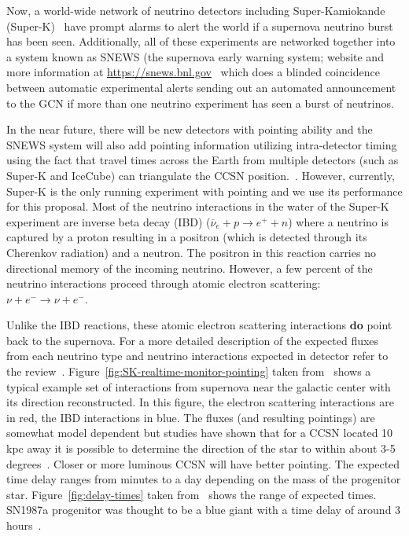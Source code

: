\documentclass[12pt, letterpaper]{article}
\newcommand{\superk}  {Super\nobreakdash-K\xspace}
\begin{document}
Now, a world-wide network of neutrino detectors including
Super-Kamiokande (\superk)~\cite{2003NIMPA.501..418F} have prompt
alarms to alert the world if a supernova neutrino burst has been seen.
Additionally, all of these experiments are networked together into a
system known as SNEWS (the supernova early warning system; website and
more information at
\url{https://snews.bnl.gov}~\cite{2004NJPh....6..114A} which does a
blinded coincidence between automatic experimental alerts sending out
an automated announcement to the GCN if more than one neutrino
experiment has seen a burst of neutrinos.

In the near future, there will be new detectors with pointing ability
and the SNEWS system will also add pointing information utilizing
intra-detector timing using the fact that travel times across the
Earth from multiple detectors (such as \superk and IceCube) can
triangulate the CCSN position.~\cite{Katepaper}.  However, currently,
\superk is the only running experiment with pointing and we use its
performance for this proposal. Most of the neutrino interactions in
the water of the \superk experiment are inverse beta decay (IBD)
($ \overline{\nu}_{e}+ p \rightarrow e^{+} + n $) where a neutrino is
captured by a proton resulting in a positron (which is detected
through its Cherenkov radiation) and a neutron.  The positron in this
reaction carries no directional memory of the incoming
neutrino. However, a few percent of the neutrino interactions proceed
through atomic electron scattering:
$\nu + e^{-} \rightarrow \nu + e^{-} .$

Unlike the IBD reactions, these atomic electron scattering
interactions {\bf do} point back to the supernova.  For a more
detailed description of the expected fluxes from each neutrino type
and neutrino interactions expected in detector refer to the
review~\cite{2012ARNPS..62...81S}.
Figure~\ref{fig:SK-realtime-monitor-pointing} taken
from~\cite{2016APh....81...39A} shows a typical example set of
interactions from supernova near the galactic center with its
direction reconstructed.  In this figure, the electron scattering
interactions are in red, the IBD interactions in blue.  The fluxes
(and resulting pointings) are somewhat model dependent but studies
have shown that for a CCSN located 10 kpc away it is possible to
determine the direction of the star to within about 3-5
degrees~\cite{2016APh....81...39A}.  Closer or more luminous CCSN will
have better pointing.  The expected time delay ranges from minutes to
a day depending on the mass of the progenitor
star. Figure~\ref{fig:delay-times} taken
from~\cite{2013ApJ...778...81K} shows the range of expected times.
SN1987a progenitor was thought to be a blue giant with a time delay of
around 3 hours~\cite{ISAWTHISSOMWHERE}.
\end{document}
